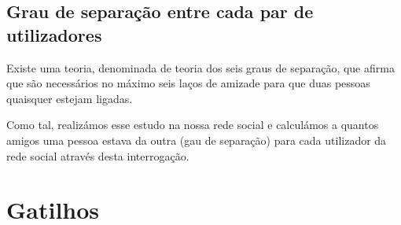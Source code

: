 \documentclass[12pt]{report}
\begin{document}
\section{Grau de separação entre cada par de utilizadores}
    
Existe uma teoria, denominada de teoria dos seis graus de separação, que afirma que são necessários no máximo seis laços de amizade para que duas pessoas quaisquer estejam ligadas. \par

Como tal, realizámos esse estudo na nossa rede social e calculámos a quantos amigos uma pessoa estava da outra (gau de separação) para cada utilizador da rede social através desta interrogação.


\begin{figure}[H]
    \centering
\end{figure}

\chapter{Gatilhos}
\end{document}
